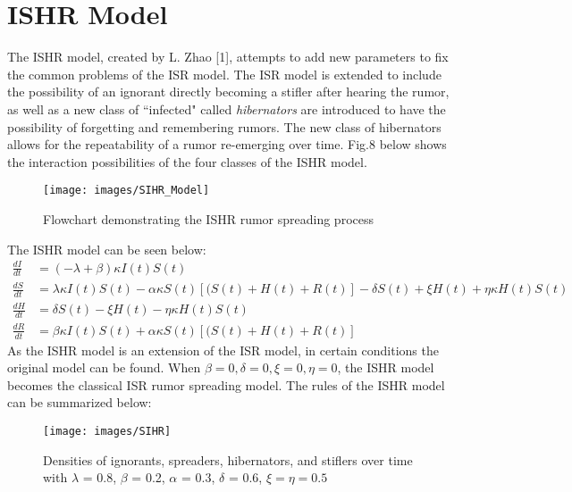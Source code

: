 \documentclass[11pt]{article}
\begin{document}
\section{ISHR Model}
The ISHR model, created by L. Zhao [1], attempts to add new parameters to fix the common problems of the ISR model. The ISR model is extended to include the possibility of an ignorant directly becoming a stifler after hearing the rumor, as well as a new class of ``infected" called \textit{hibernators} are introduced to have the possibility of forgetting and remembering rumors. The new class of hibernators allows for the repeatability of a rumor re-emerging over time. Fig.8 below shows the interaction possibilities of the four classes of the ISHR model. 


\begin{figure}[h!] 
\texttt{[image: images/SIHR\_Model]}
\caption{Flowchart demonstrating the ISHR rumor spreading process} \label{ffc}
\end{figure} 

The ISHR model can be seen below: 
	\begin{align}
    \frac{dI}{dt} &= (-\lambda + \beta)\kappa I(t)S(t) \\
    \frac{dS}{dt} &= \lambda\kappa I(t)S(t) - \alpha\kappa S(t)[(S(t)+H(t)+R(t)] -\delta S(t) + \xi H(t) + \eta\kappa H(t) S(t) \\
    \frac{dH}{dt} &= \delta S(t) - \xi H(t) - \eta\kappa H(t)S(t) \\
    \frac{dR}{dt} &= \beta\kappa I(t)S(t) + \alpha\kappa S(t)[(S(t)+H(t)+R(t)]
    \end{align}
As the ISHR model is an extension of the ISR model, in certain conditions the original model can be found. When $\beta=0,\delta=0,\xi=0,\eta=0$, the ISHR model becomes the classical ISR rumor spreading model. The rules of the ISHR model can be summarized below:
\begin{figure}[h!] 
\begin{center}
\texttt{[image: images/SIHR]}
\caption{Densities of ignorants, spreaders, hibernators, and stiflers over time with $\lambda$ = 0.8, $\beta$ = 0.2, $\alpha$ = 0.3, $\delta$ = 0.6, $\xi = \eta = 0.5$} 
\label{sihr}
\end{center}
\end{figure}
\end{document}
